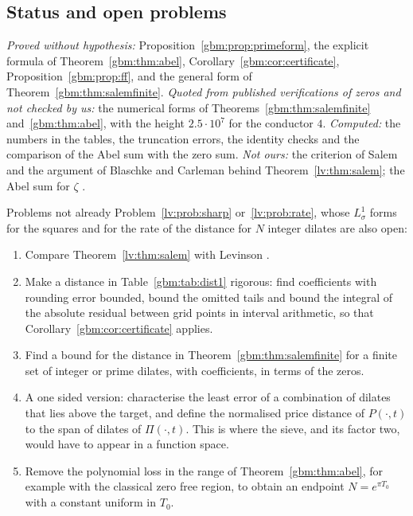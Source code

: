 \subsection{Status and open problems}

\emph{Proved without hypothesis:} Proposition~\ref{gbm:prop:primeform}, the explicit formula of Theorem~\ref{gbm:thm:abel}, Corollary~\ref{gbm:cor:certificate}, Proposition~\ref{gbm:prop:ff}, and the general form of Theorem~\ref{gbm:thm:salemfinite}. \emph{Quoted from published verifications of zeros and not checked by us:} the numerical forms of Theorems~\ref{gbm:thm:salemfinite} and~\ref{gbm:thm:abel}, with the height $2.5\cdot10^7$ for the conductor $4$. \emph{Computed:} the numbers in the tables, the truncation errors, the identity checks and the comparison of the Abel sum with the zero sum. \emph{Not ours:} the criterion of Salem and the argument of Blaschke and Carleman behind Theorem~\ref{lv:thm:salem}; the Abel sum for $\zeta$ \cite{HL16}.

Problems not already Problem~\ref{lv:prob:sharp} or~\ref{lv:prob:rate}, whose $L^1_\sigma$ forms for the squares and for the rate of the distance for $N$ integer dilates are also open:
\begin{enumerate}
\item Compare Theorem~\ref{lv:thm:salem} with Levinson \cite{Levinson56}.
\item Make a distance in Table~\ref{gbm:tab:dist1} rigorous: find coefficients with rounding error bounded, bound the omitted tails and bound the integral of the absolute residual between grid points in interval arithmetic, so that Corollary~\ref{gbm:cor:certificate} applies.
\item Find a bound for the distance in Theorem~\ref{gbm:thm:salemfinite} for a finite set of integer or prime dilates, with coefficients, in terms of the zeros.
\item A one sided version: characterise the least error of a combination of dilates that lies above the target, and define the normalised price distance of $P(\cdot,t)$ to the span of dilates of $\Pi(\cdot,t)$. This is where the sieve, and its factor two, would have to appear in a function space.
\item Remove the polynomial loss in the range of Theorem~\ref{gbm:thm:abel}, for example with the classical zero free region, to obtain an endpoint $N=e^{\pi T_0}$ with a constant uniform in $T_0$.
\end{enumerate}
